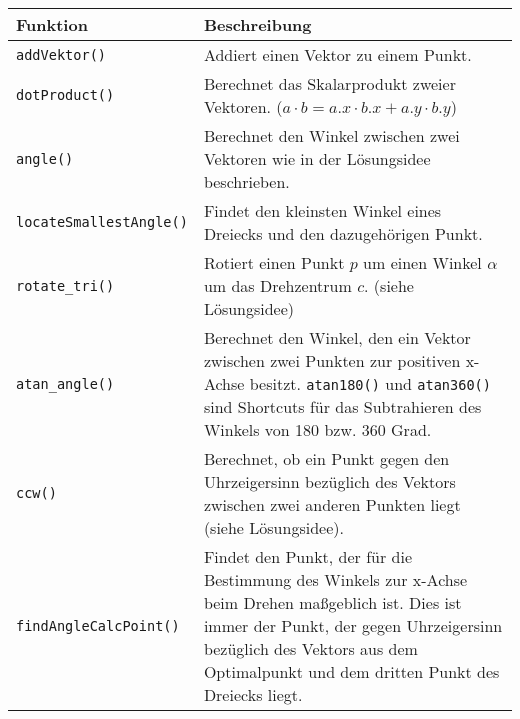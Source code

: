 \documentclass[a4paper, notitlepage, 12pt]{scrartcl}
\begin{document}
\begin{longtabu} to \linewidth {lX}
	Funktion & Beschreibung \\ \hline \hline \endhead
	\texttt{addVektor()} & Addiert einen Vektor zu einem Punkt. \\ \hline
	\texttt{dotProduct()} & Berechnet das Skalarprodukt zweier Vektoren. ($a \cdot b = a.x \cdot b.x + a.y \cdot b.y$) \\ \hline
	\texttt{angle()} & Berechnet den Winkel zwischen zwei Vektoren wie in der Lösungsidee beschrieben.\\ \hline
	\texttt{locateSmallestAngle()} &  Findet den kleinsten Winkel eines Dreiecks und den dazugehörigen Punkt.\\ \hline
	\texttt{rotate\_tri()} & Rotiert einen Punkt $p$ um einen Winkel $\alpha$ um das Drehzentrum $c$. (siehe Lösungsidee)\\ \hline
	\texttt{atan\_angle()}& Berechnet den Winkel, den ein Vektor zwischen zwei Punkten zur positiven x-Achse besitzt. \texttt{atan180()} und \texttt{atan360()} sind Shortcuts für das Subtrahieren des Winkels von 180 bzw. 360 Grad. \\ \hline
	\texttt{ccw()} & Berechnet, ob ein Punkt gegen den Uhrzeigersinn bezüglich des Vektors zwischen zwei anderen Punkten liegt (siehe Lösungsidee).\\ \hline
	\texttt{findAngleCalcPoint()} & Findet den Punkt, der für die Bestimmung des Winkels zur x-Achse beim Drehen maßgeblich ist. Dies ist immer der Punkt, der gegen Uhrzeigersinn bezüglich des Vektors aus dem Optimalpunkt und dem dritten Punkt des Dreiecks liegt.\\
\end{longtabu}
\end{document}
